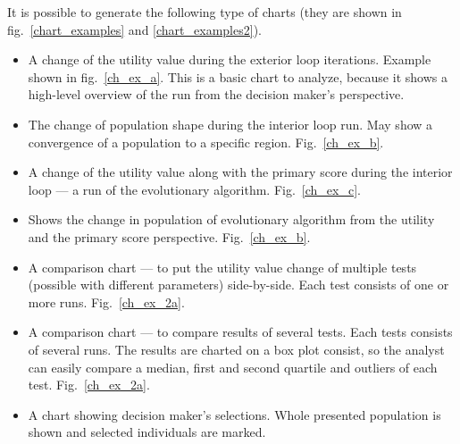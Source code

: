 It is possible to generate the following type of charts (they are shown in
fig.~\ref{chart_examples} and \ref{chart_examples2}).
\begin{itemize}
\item A change of the utility value during the exterior loop
  iterations. Example shown in fig.~\ref{ch_ex_a}. This is a basic chart to
  analyze, because it shows a high-level overview of the run from the decision
  maker's perspective.
\item The change of population shape during the interior loop run. May show a
  convergence of a population to a specific region. Fig.~\ref{ch_ex_b}.
\item A change of the utility value along with the primary score during the
  interior loop --- a run of the evolutionary algorithm. Fig.~\ref{ch_ex_c}.
\item Shows the change in population of evolutionary algorithm from the
  utility and the primary score perspective. Fig.~\ref{ch_ex_b}.
\item A comparison chart --- to put the utility value change of multiple tests
  (possible with different parameters) side-by-side. Each test consists of one
  or more runs. Fig.~\ref{ch_ex_2a}.
\item A comparison chart --- to compare results of several tests. Each tests
  consists of several runs. The results are charted on a box plot consist, so
  the analyst can easily compare a median, first and second quartile and
  outliers of each test. Fig.~\ref{ch_ex_2a}.
\item A chart showing decision maker's selections. Whole presented population
  is shown and selected individuals are marked.
\end{itemize}

